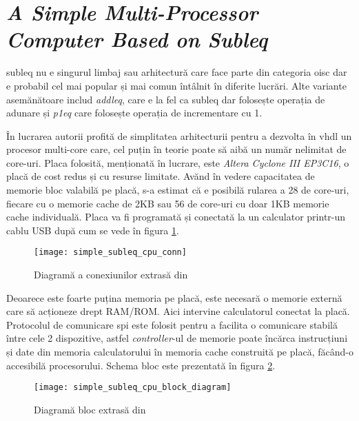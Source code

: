 \documentclass[../main.tex]{subfiles}
\begin{document}
\section{\emph{A Simple Multi-Processor Computer Based on Subleq}}
\acrshort{subleq} nu e singurul limbaj sau arhitectură care face parte din categoria \acrshort{oisc}
dar e probabil cel mai popular și mai comun întâlnit în diferite lucrări. Alte variante
asemănătoare includ \emph{\acrfull{addleq}}, care e la fel ca \acrshort{subleq} dar folosește operația
de adunare și \emph{\acrfull{p1eq}} care folosește operația de incrementare cu 1.

În lucrarea \cite{subleqcpu} autorii profită de simplitatea arhitecturii pentru a dezvolta în \acrshort{vhdl} un procesor
multi-core care, cel puțin în teorie poate să aibă un număr nelimitat de core-uri. Placa folosită, menționată în lucrare,
este \emph{Altera Cyclone III EP3C16}, o placă de cost redus și cu resurse limitate. Avănd în vedere capacitatea de
memorie bloc valabilă pe placă, s-a estimat că e posibilă rularea a 28 de core-uri, fiecare cu o memorie cache de 2KB
sau 56 de core-uri cu doar 1KB memorie cache individuală. Placa va fi programată și conectată la un calculator printr-un
cablu USB după cum se vede în figura \ref{fig:simple_subleq_cpu_conn}.

\begin{figure}[h]
    \centering
    \texttt{[image: simple\_subleq\_cpu\_conn]}
    \caption{Diagramă a conexiunilor extrasă din \cite{subleqcpu}}
    \label{fig:simple_subleq_cpu_conn}
\end{figure}

Deoarece este foarte puțina memoria pe placă, este necesară o memorie externă care să acționeze drept RAM/ROM.
Aici intervine calculatorul conectat la placă. Protocolul de comunicare \acrshort{spi} este folosit pentru a
facilita o comunicare stabilă între cele 2 dispozitive, astfel \emph{controller}-ul de memorie poate încărca
instrucțiuni și date din memoria calculatorului în memoria cache construită pe placă, făcând-o accesibilă
procesorului. Schema bloc este prezentată în figura \ref{fig:simple_subleq_cpu_block_diagram}.

\begin{figure}[h]
    \centering
    \texttt{[image: simple\_subleq\_cpu\_block\_diagram]}
    \caption{Diagramă bloc extrasă din \cite{subleqcpu}}
    \label{fig:simple_subleq_cpu_block_diagram}
\end{figure}
\end{document}
